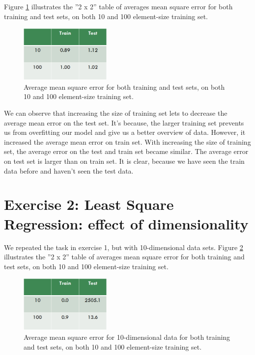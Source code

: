 \documentclass{article} %
\begin{document}
Figure \ref{fig:resultMatrix1} illustrates the ''2 x 2'' table of averages mean square error for both training and test sets, on both 10 and 100 element-size training set.
\begin{figure}[h]
\begin{center}
\includegraphics[width=0.4\textwidth]{resultsMatrix}
\end{center}
\caption{Average mean square error for both training and test sets, on both 10 and 100 element-size training set.}
\label{fig:resultMatrix1}
\end{figure}

We can observe that increasing the size of training set lets to decrease the average mean error on the test set. It's because, the larger training set prevents us from overfitting our model and give us a better overview of data. 
However, it increased the average mean error on train set.
With increasing the size of training set, the average error on the test and train set became similar. The average error on test set is larger than on train set. It is clear, because we have seen the train data before and haven't seen the test data.

\section{Exercise 2: Least Square Regression: effect of dimensionality}
We repeated the task in exercise 1, but with 10-dimensional data sets. Figure \ref{fig:resultMatrix2} illustrates the ''2 x 2'' table of averages mean square error for both training and test sets, on both 10 and 100 element-size training set.
\begin{figure}[h]
\begin{center}
\includegraphics[width=0.4\textwidth]{resultsMatrix2}
\end{center}
\caption{Average mean square error for 10-dimensional data for both training and test sets, on both 10 and 100 element-size training set.}
\label{fig:resultMatrix2}
\end{figure}
\end{document}
